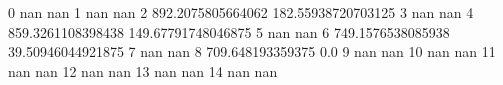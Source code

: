 0 nan nan
1 nan nan
2 892.2075805664062 182.55938720703125
3 nan nan
4 859.3261108398438 149.67791748046875
5 nan nan
6 749.1576538085938 39.50946044921875
7 nan nan
8 709.648193359375 0.0
9 nan nan
10 nan nan
11 nan nan
12 nan nan
13 nan nan
14 nan nan
